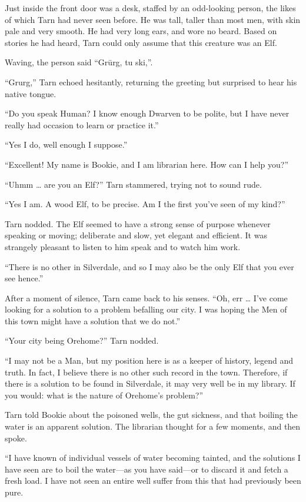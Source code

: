 Just inside the front door was a desk, staffed by an odd-looking person, the likes of which Tarn had never seen before.  He was tall, taller than most men, with skin pale and very smooth.  He had very long ears, and wore no beard.  Based on stories he had heard, Tarn could only assume that this creature was an Elf.

Waving, the person said ``Gr\=urg, tu ski,''.

``Grurg,'' Tarn echoed hesitantly, returning the greeting but surprised to hear his native tongue.

``Do you speak Human?  I know enough Dwarven to be polite, but I have never really had occasion to learn or practice it.''

``Yes I do, well enough I suppose.''

``Excellent!  My name is Bookie, and I am librarian here.  How can I help you?''

``Uhmm \ldots{} are you an Elf?'' Tarn stammered, trying not to sound rude.

``Yes I am.  A wood Elf, to be precise.  Am I the first you've seen of my kind?''

Tarn nodded.  The Elf seemed to have a strong sense of purpose whenever speaking or moving; deliberate and slow, yet elegant and efficient.  It was strangely pleasant to listen to him speak and to watch him work.

``There is no other in Silverdale, and so I may also be the only Elf that you ever see hence.''

After a moment of silence, Tarn came back to his senses.  ``Oh, err \ldots{} I've come looking for a solution to a problem befalling our city.  I was hoping the Men of this town might have a solution that we do not.''

``Your city being Orehome?''  Tarn nodded.

``I may not be a Man, but my position here is as a keeper of history, legend and truth.  In fact, I believe there is no other such record in the town.  Therefore, if there is a solution to be found in Silverdale, it may very well be in my library. If you would: what is the nature of Orehome's problem?''

Tarn told Bookie about the poisoned wells, the gut sickness, and that boiling the water is an apparent solution.  The librarian thought for a few moments, and then spoke.

``I have known of individual vessels of water becoming tainted, and the solutions I have seen are to boil the water---as you have said---or to discard it and fetch a fresh load.  I have not seen an entire well suffer from this that had previously been pure.

